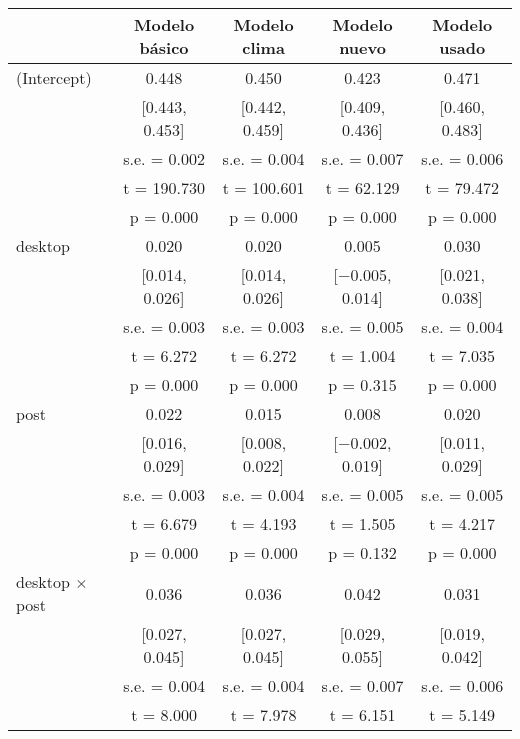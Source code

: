 \documentclass[
  12pt]{article}
\begin{document}
\begin{table}[H]
\centering
\begin{tabular}[t]{lcccc}
\toprule
  & Modelo básico & Modelo clima & Modelo nuevo & Modelo usado\\
\midrule
(Intercept) & \num{0.448} & \num{0.450} & \num{0.423} & \num{0.471}\\
 & {}[\num{0.443}, \num{0.453}] & {}[\num{0.442}, \num{0.459}] & {}[\num{0.409}, \num{0.436}] & {}[\num{0.460}, \num{0.483}]\\
 & s.e. = \num{0.002} & s.e. = \num{0.004} & s.e. = \num{0.007} & s.e. = \num{0.006}\\
 & t = \num{190.730} & t = \num{100.601} & t = \num{62.129} & t = \num{79.472}\\
 & p = \num{0.000} & p = \num{0.000} & p = \num{0.000} & p = \vphantom{1} \num{0.000}\\
desktop & \num{0.020} & \num{0.020} & \num{0.005} & \num{0.030}\\
 & {}[\num{0.014}, \num{0.026}] & {}[\num{0.014}, \num{0.026}] & {}[\num{-0.005}, \num{0.014}] & {}[\num{0.021}, \num{0.038}]\\
 & s.e. = \num{0.003} & s.e. = \num{0.003} & s.e. = \num{0.005} & s.e. = \num{0.004}\\
 & t = \num{6.272} & t = \num{6.272} & t = \num{1.004} & t = \num{7.035}\\
 & p = \num{0.000} & p = \num{0.000} & p = \num{0.315} & p = \num{0.000}\\
post & \num{0.022} & \num{0.015} & \num{0.008} & \num{0.020}\\
 & {}[\num{0.016}, \num{0.029}] & {}[\num{0.008}, \num{0.022}] & {}[\num{-0.002}, \num{0.019}] & {}[\num{0.011}, \num{0.029}]\\
 & s.e. = \num{0.003} & s.e. = \num{0.004} & s.e. = \num{0.005} & s.e. = \num{0.005}\\
 & t = \num{6.679} & t = \num{4.193} & t = \num{1.505} & t = \num{4.217}\\
 & p = \num{0.000} & p = \num{0.000} & p = \num{0.132} & p = \num{0.000}\\
desktop × post & \num{0.036} & \num{0.036} & \num{0.042} & \num{0.031}\\
 & {}[\num{0.027}, \num{0.045}] & {}[\num{0.027}, \num{0.045}] & {}[\num{0.029}, \num{0.055}] & {}[\num{0.019}, \num{0.042}]\\
 & s.e. = \num{0.004} & s.e. = \num{0.004} & s.e. = \num{0.007} & s.e. = \num{0.006}\\
 & t = \num{8.000} & t = \num{7.978} & t = \num{6.151} & t = \num{5.149}\\

\end{tabular}
\end{table}
\end{document}
